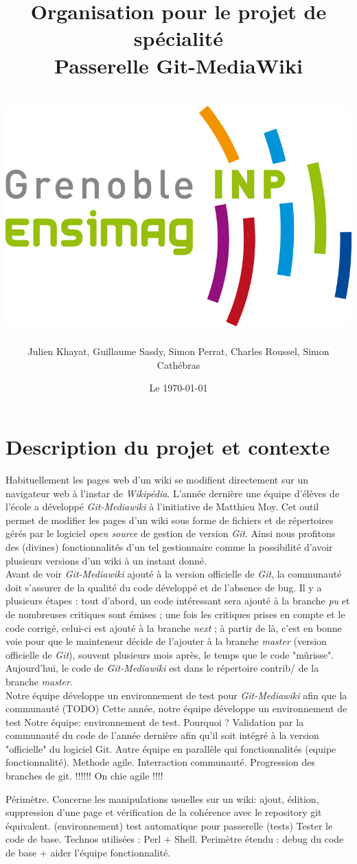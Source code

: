 \documentclass[11pt]{article}
\title{Organisation pour le projet de spécialité\\
Passerelle Git-MediaWiki\\
~\\
\includegraphics[scale=0.75]{logo_ensimag.jpg} 
}
\author{Julien Khayat, Guillaume Sasdy, Simon Perrat, Charles Roussel, Simon Cathébras}
\date{Le \today}
\begin{document}
\maketitle

\section*{Description du projet et contexte}
Habituellement les pages web d'un wiki se modifient directement sur un navigateur web à l'instar de \textit{Wikipédia}. L'année dernière une équipe d'élèves de l'école a développé \textit{Git-Mediawiki} à l'initiative de Matthieu Moy. Cet outil permet de modifier les pages d'un wiki sous forme de fichiers et de répertoires gérés par le logiciel \textit{open source} de gestion de version \textit{Git}. Ainsi nous profitons des (divines) fonctionnalités d'un tel gestionnaire comme la possibilité d'avoir plusieurs versions d'un wiki à un instant donné.\\
Avant de voir \textit{Git-Mediawiki} ajouté à la version officielle de \textit{Git}, la communauté doit s'assurer de la qualité du code développé et de l'absence de bug. Il y a plusieurs étapes : tout d'abord, un code intéressant sera ajouté à la branche \textit{pu} et de nombreuses critiques sont émises ; une fois les critiques prises en compte et le code corrigé, celui-ci est ajouté à la branche \textit{next} ; à partir de là, c'est en bonne voie pour que le mainteneur décide de l'ajouter à la branche \textit{master} (version officielle de \textit{Git}), souvent plusieurs mois après, le temps que le code "mûrisse". Aujourd'hui, le code de \textit{Git-Mediawiki} est dans le répertoire contrib/ de la branche \textit{master}. \\
Notre équipe développe un environnement de test pour \textit{Git-Mediawiki} afin que la communauté 
(TODO)
Cette année, notre équipe développe un environnement de test 
Notre équipe: environnement de test. Pourquoi ? Validation par la communauté du code de l'année dernière afin qu'il soit     intégré à la version "officielle" du logiciel Git.
Autre équipe en parallèle qui fonctionnalités (equipe fonctionnalité).
Methode agile. Interraction communauté. Progression des branches de git.
!!!!!! On chie agile !!!!


Périmètre. Concerne les manipulations usuelles sur un wiki: ajout, édition, suppression d'une page et vérification de la     cohérence avec le repository git équivalent. (environnement)
test automatique pour passerelle (tests)
Tester le code de base. Technos utilisées : Perl + Shell.
Perimètre étendu : debug du code de base + aider l'équipe fonctionnalité.
		
\end{document}
